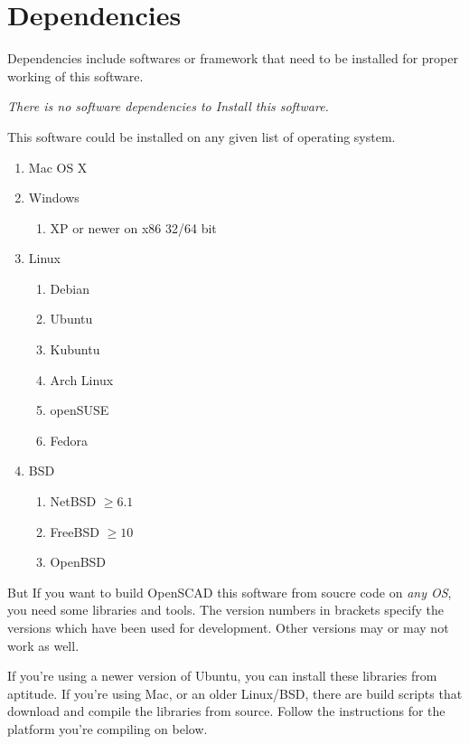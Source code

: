 \section{Dependencies}
Dependencies include softwares or framework that need to be installed for proper working of this software.

\emph{{\large There is no software dependencies to Install this software.}}

This software could be installed on any given list of operating system.

\begin{enumerate}
	\item Mac OS X
	\item Windows
	\begin{enumerate} 
		\item XP or newer on x86 32/64 bit
	\end{enumerate}
	\item Linux
	\begin{enumerate} 
		\item Debian 
		\item Ubuntu 
		\item Kubuntu
		\item Arch Linux
		\item openSUSE
		\item Fedora
	\end{enumerate}
	\item BSD
	\begin{enumerate}
		\item NetBSD  $\geq 6.1$
		\item FreeBSD $\geq 10 $
		\item OpenBSD
	\end{enumerate}
\end{enumerate}	 


But If you want to build OpenSCAD this software from soucre code on \emph{any OS}, you need some libraries and tools. The version
numbers in brackets specify the versions which have been used for
development. Other versions may or may not work as well.

If you're using a newer version of Ubuntu, you can install these 
libraries from aptitude. If you're using Mac, or an older Linux/BSD, there 
are build scripts that download and compile the libraries from source. 
Follow the instructions for the platform you're compiling on below.

